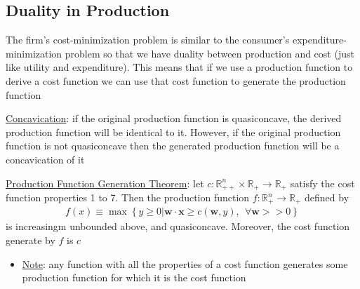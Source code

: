 \documentclass{article}
\begin{document}
\subsection{Duality in Production}
The firm's cost-minimization problem is similar to the consumer's expenditure-minimization problem so that we have duality between production and cost (just like utility and expenditure). This means that if we use a production function to derive a cost function we can use that cost function to generate the production function \par \vspace{0.3em}
  \underline{Concavication}: if the original production function is quasiconcave, the derived production function will be identical to it. However, if the original production function is not quasiconcave then the generated production function will be a concavication of it
  \par
  \underline{Production Function Generation Theorem}: let $c: \mathbb{R}_{++}^{n} \times \mathbb{R}_{+} \rightarrow \mathbb{R}_{+}$ satisfy the cost function properties 1 to 7. Then the production function $f: \mathbb{R}_{+}^{n} \rightarrow \mathbb{R}_{+}$ defined by
  \begin{gather*}
    f(x) \equiv \max \left\{ y \geq 0 | \mathbf{w} \cdot \mathbf{x} \geq c(\mathbf{w}, y), \ \ \forall \mathbf{w} >> 0 \right\}
  \end{gather*}
  is increasingm unbounded above, and quasiconcave. Moreover, the cost function generate by $f$ is $c$
  \begin{itemize}
    \item  \underline{Note}: any function with all the properties of a cost function generates some production function for which it is the cost function
  \end{itemize}
  \par
\end{document}
